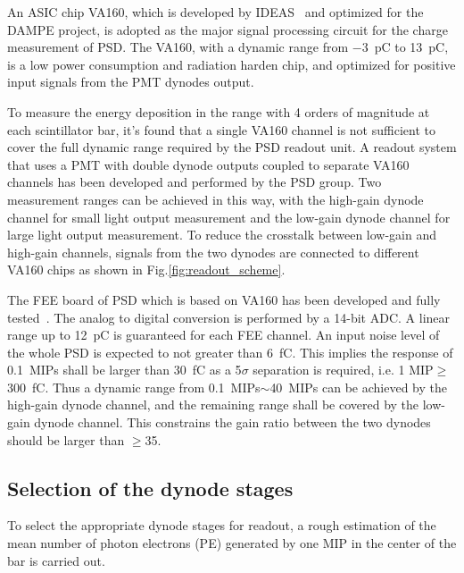\documentclass[preprint, times]{elsarticle}
\begin{document}
 An ASIC chip VA160, which is developed by IDEAS~\cite{va160} and optimized for the DAMPE project, is adopted as the major signal processing circuit for the charge measurement of PSD.
 The VA160, with a dynamic range from \SI{-3}{\pico\coulomb} to \SI{13}{\pico\coulomb}, is a low power consumption and radiation harden chip, and optimized for positive input signals from the PMT dynodes output.

To measure the energy deposition in the range with 4 orders of magnitude at each scintillator bar, it's found that a single VA160 channel is not sufficient to cover the full dynamic range required by the PSD readout unit. A readout system that uses a PMT with double dynode outputs coupled to separate VA160 channels has been developed and performed by the PSD group. Two measurement ranges can be achieved in this way, with the high-gain dynode channel for small light output measurement and the low-gain dynode channel for large light output measurement. To reduce the crosstalk between low-gain and high-gain channels, signals from the two dynodes are connected to different VA160 chips as shown in Fig.\ref{fig:readout_scheme}.

The FEE board of PSD which is based on VA160 has been developed and fully tested~\cite{fee}. The analog to digital conversion is performed by a 14-bit ADC. A linear range up to \SI{12}{\pico\coulomb} is guaranteed for each FEE channel. An input noise level of the whole PSD is expected to not greater than \SI{6}{\femto\coulomb}. This implies the response of \SI{0.1}{MIPs} shall be larger than \SI{30}{\femto\coulomb} as a 5$\sigma$ separation is required, i.e. 1 MIP$\geq$\SI{300}{\femto\coulomb}.
 Thus a dynamic range from \SI{0.1}{MIPs}$\sim$\SI{40}{MIPs} can be achieved by the high-gain dynode channel, and the remaining range shall be covered by the low-gain dynode channel.
This constrains the gain ratio between the two dynodes should be larger than $\geq$35.

\subsection{Selection of the dynode stages}
\label{sec:dynodes_selection}
To select the appropriate dynode stages for readout, a rough estimation of the mean number of photon electrons (PE) generated by one MIP in the center of the bar is carried out.
\end{document}
